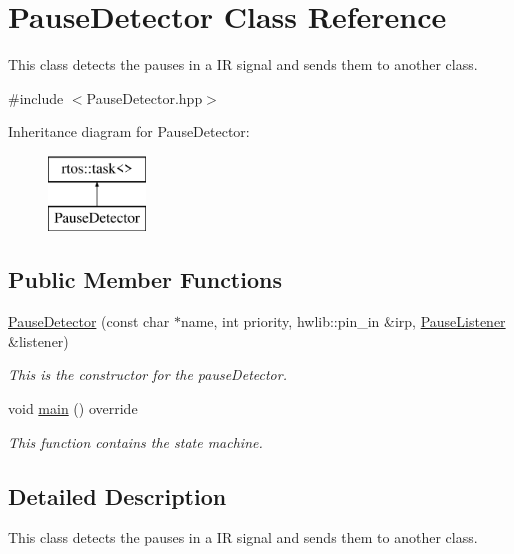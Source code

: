 \hypertarget{class_pause_detector}{}\section{Pause\+Detector Class Reference}
\label{class_pause_detector}


This class detects the pauses in a IR signal and sends them to another class.  




{\ttfamily \#include $<$Pause\+Detector.\+hpp$>$}

Inheritance diagram for Pause\+Detector\+:\begin{figure}[H]
\begin{center}
\leavevmode
\includegraphics[height=2.000000cm]{class_pause_detector}
\end{center}
\end{figure}
\subsection*{Public Member Functions}
\begin{DoxyCompactItemize}
\item 
\mbox{\hyperlink{class_pause_detector_a89abb61f172dcdcdda2ab5ce3792983f}{Pause\+Detector}} (const char $\ast$name, int priority, hwlib\+::pin\+\_\+in \&irp, \mbox{\hyperlink{class_pause_listener}{Pause\+Listener}} \&listener)
\begin{DoxyCompactList}\small\item\em This is the constructor for the pause\+Detector. \end{DoxyCompactList}\item 
void \mbox{\hyperlink{class_pause_detector_a0ee4661673d1e5604877903c5d2cb35e}{main}} () override
\begin{DoxyCompactList}\small\item\em This function contains the state machine. \end{DoxyCompactList}\end{DoxyCompactItemize}


\subsection{Detailed Description}
This class detects the pauses in a IR signal and sends them to another class. 

